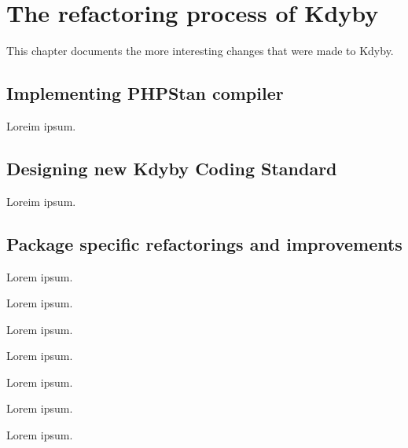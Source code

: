 \chapter{The refactoring process of Kdyby}

This chapter documents the more interesting changes that were made to Kdyby.

\section{Implementing PHPStan compiler}

Loreim ipsum.

\section{Designing new Kdyby Coding Standard}

Loreim ipsum.

\section{Package specific refactorings and improvements}


Lorem ipsum.


Lorem ipsum.


Lorem ipsum.

%


Lorem ipsum.


Lorem ipsum.


Lorem ipsum.


Lorem ipsum.
